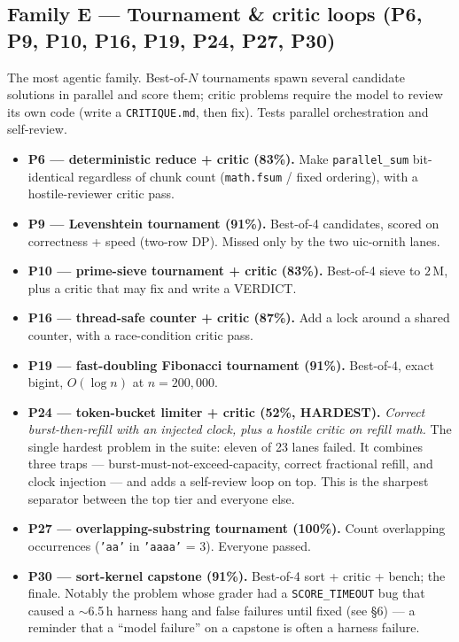 \documentclass[11pt]{article}
\begin{document}
\subsection{Family E --- Tournament \& critic loops (P6, P9, P10, P16, P19, P24, P27, P30)}
The most agentic family. Best-of-$N$ tournaments spawn several candidate solutions in
parallel and score them; critic problems require the model to review its own code
(write a \texttt{CRITIQUE.md}, then fix). Tests parallel orchestration and
self-review.

\begin{itemize}
\item \textbf{P6 --- deterministic reduce + critic (83\%).} Make
  \texttt{parallel\_sum} bit-identical regardless of chunk count (\texttt{math.fsum}
  / fixed ordering), with a hostile-reviewer critic pass.
\item \textbf{P9 --- Levenshtein tournament (91\%).} Best-of-4 candidates, scored on
  correctness + speed (two-row DP). Missed only by the two uic-ornith lanes.
\item \textbf{P10 --- prime-sieve tournament + critic (83\%).} Best-of-4 sieve to
  $2\,$M, plus a critic that may fix and write a VERDICT.
\item \textbf{P16 --- thread-safe counter + critic (87\%).} Add a lock around a
  shared counter, with a race-condition critic pass.
\item \textbf{P19 --- fast-doubling Fibonacci tournament (91\%).} Best-of-4, exact
  bigint, $O(\log n)$ at $n=200{,}000$.
\item \textbf{P24 --- token-bucket limiter + critic (52\%, HARDEST).} \emph{Correct
  burst-then-refill with an injected clock, plus a hostile critic on refill math.}
  The single hardest problem in the suite: eleven of 23 lanes failed. It combines
  three traps --- burst-must-not-exceed-capacity, correct fractional refill, and
  clock injection --- and adds a self-review loop on top. This is the sharpest
  separator between the top tier and everyone else.
\item \textbf{P27 --- overlapping-substring tournament (100\%).} Count overlapping
  occurrences (\texttt{'aa'} in \texttt{'aaaa'} = 3). Everyone passed.
\item \textbf{P30 --- sort-kernel capstone (91\%).} Best-of-4 sort + critic + bench;
  the finale. Notably the problem whose grader had a \texttt{SCORE\_TIMEOUT} bug that
  caused a $\sim$6.5\,h harness hang and false failures until fixed (see \S6) --- a
  reminder that a ``model failure'' on a capstone is often a harness failure.
\end{itemize}
\end{document}
